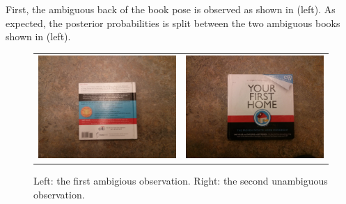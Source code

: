         First, the ambiguous back of the book pose is observed as shown in  (left). As expected, the posterior probabilities is split between the two ambiguous books shown in  (left).

        \begin{figure}[h]
            \centering
            \begin{tabular}{cc} 
                \includegraphics[scale=0.05]{pics/obs1.jpg}
                    &
                \includegraphics[scale=0.05]{pics/obs2.jpg}
            \end{tabular}
            \caption{Left: the first ambigious observation. Right: the second unambiguous observation.}
            \label{fig:expObs}
        \end{figure}

